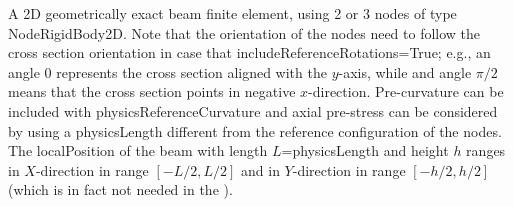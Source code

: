 \ei

%
\newpage


\label{sec:item:ObjectBeamGeometricallyExact2D}
A 2D geometrically exact beam finite element, using 2 or 3 nodes of type NodeRigidBody2D. Note that the orientation of the nodes need to follow the cross section orientation in case that includeReferenceRotations=True; e.g., an angle 0 represents the cross section aligned with the $y$-axis, while and angle $\pi/2$ means that the cross section points in negative $x$-direction. Pre-curvature can be included with physicsReferenceCurvature and axial pre-stress can be considered by using a physicsLength different from the reference configuration of the nodes. The localPosition of the beam with length $L$=physicsLength and height $h$ ranges in $X$-direction in range $[-L/2, L/2]$ and in $Y$-direction in range $[-h/2,h/2]$ (which is in fact not needed in the ).
\vspace{12pt}\\

